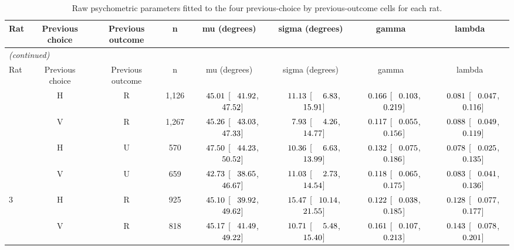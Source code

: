 \begin{landscape}
\scriptsize
\setlength{\tabcolsep}{3.0pt}
\begin{longtable}{lccccccc}
\caption{Raw psychometric parameters fitted to the four previous-choice by previous-outcome cells for each rat.}
\label{tab:section3-raw-fitted-parameters} \\
\toprule
Rat & Previous choice & Previous outcome & n & mu (degrees) & sigma (degrees) & gamma & lambda \\
\midrule
\endfirsthead
\multicolumn{8}{l}{\textit{(continued)}} \\
\toprule
Rat & Previous choice & Previous outcome & n & mu (degrees) & sigma (degrees) & gamma & lambda \\
\midrule
\endhead
\bottomrule
\endfoot
\bottomrule
\endlastfoot
2 & H & R & 1,126 & $\hphantom{-}45.01$ [$\hphantom{-}41.92$, $\hphantom{-}47.52$] & $\hphantom{-}11.13$ [$\hphantom{-}\hphantom{0}6.83$, $\hphantom{-}15.91$] & $\hphantom{-}0.166$ [$\hphantom{-}0.103$, $\hphantom{-}0.219$] & $\hphantom{-}0.081$ [$\hphantom{-}0.047$, $\hphantom{-}0.116$] \\
 & V & R & 1,267 & $\hphantom{-}45.26$ [$\hphantom{-}43.03$, $\hphantom{-}47.33$] & $\hphantom{-}\hphantom{0}7.93$ [$\hphantom{-}\hphantom{0}4.26$, $\hphantom{-}14.77$] & $\hphantom{-}0.117$ [$\hphantom{-}0.055$, $\hphantom{-}0.156$] & $\hphantom{-}0.088$ [$\hphantom{-}0.049$, $\hphantom{-}0.119$] \\
 & H & U & 570 & $\hphantom{-}47.50$ [$\hphantom{-}44.23$, $\hphantom{-}50.52$] & $\hphantom{-}10.36$ [$\hphantom{-}\hphantom{0}6.63$, $\hphantom{-}13.99$] & $\hphantom{-}0.132$ [$\hphantom{-}0.075$, $\hphantom{-}0.186$] & $\hphantom{-}0.078$ [$\hphantom{-}0.025$, $\hphantom{-}0.135$] \\
 & V & U & 659 & $\hphantom{-}42.73$ [$\hphantom{-}38.65$, $\hphantom{-}46.67$] & $\hphantom{-}11.03$ [$\hphantom{-}\hphantom{0}2.73$, $\hphantom{-}14.54$] & $\hphantom{-}0.118$ [$\hphantom{-}0.065$, $\hphantom{-}0.175$] & $\hphantom{-}0.083$ [$\hphantom{-}0.041$, $\hphantom{-}0.136$] \\
3 & H & R & 925 & $\hphantom{-}45.10$ [$\hphantom{-}39.92$, $\hphantom{-}49.62$] & $\hphantom{-}15.47$ [$\hphantom{-}10.14$, $\hphantom{-}21.55$] & $\hphantom{-}0.122$ [$\hphantom{-}0.038$, $\hphantom{-}0.185$] & $\hphantom{-}0.128$ [$\hphantom{-}0.077$, $\hphantom{-}0.177$] \\
 & V & R & 818 & $\hphantom{-}45.17$ [$\hphantom{-}41.49$, $\hphantom{-}49.22$] & $\hphantom{-}10.71$ [$\hphantom{-}\hphantom{0}5.48$, $\hphantom{-}15.40$] & $\hphantom{-}0.161$ [$\hphantom{-}0.107$, $\hphantom{-}0.213$] & $\hphantom{-}0.143$ [$\hphantom{-}0.078$, $\hphantom{-}0.201$] \\

\end{longtable}
\end{landscape}
